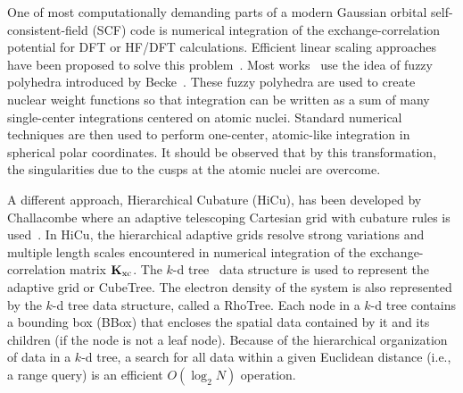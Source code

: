 \documentclass[preprint]{revtex4}
\newcommand{\Kxc}{{\bf K}_{\mathrm{xc}}}
\begin{document}
One of most computationally demanding parts of a modern Gaussian
orbital self-consistent-field (SCF) code is numerical integration of
the exchange-correlation potential for DFT or HF/DFT
calculations. Efficient linear scaling approaches have been proposed
to solve this problem~\cite{Challacombe_00v113,Jorda95,Stratmann96}.
Most works~\cite{Furlani_00v128,Jorda95,Stratmann96,Scuseria99} use the idea of
fuzzy polyhedra introduced by Becke~\cite{Becke88}.  These fuzzy
polyhedra are used to create nuclear weight functions so that
integration can be written as a sum of many single-center integrations
centered on atomic nuclei.  Standard numerical techniques are then
used to perform one-center, atomic-like integration in spherical polar
coordinates.  It should be observed that by this transformation, the
singularities due to the cusps at the atomic nuclei are overcome.

A different approach, Hierarchical Cubature (HiCu), has been developed
by Challacombe where an adaptive telescoping Cartesian grid with
cubature rules is used~\cite{Challacombe_00v113}.  In HiCu, the
hierarchical adaptive grids resolve strong variations and multiple
length scales encountered in numerical integration of the
exchange-correlation matrix $\Kxc$.  The $k$-d
tree~\cite{Bentley79,Bentley80,Gaede98} data structure is used to
represent the adaptive grid or CubeTree. The electron density of the
system is also represented by the $k$-d tree data structure, called a
RhoTree.  Each node in a $k$-d tree contains a bounding box (BBox)
that encloses the spatial data contained by it and its children (if
the node is not a leaf node).  Because of the hierarchical
organization of data in a $k$-d tree, a search for all data within a
given Euclidean distance (i.e., a range query) is an efficient
$O(\log_{2}N)$ operation.
\end{document}
